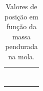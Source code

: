 \begin{table}
\begin{tabular}{lp{25mm}p{25mm}p{25mm}l}
	& \cellcolor[gray]{0.95} & \cellcolor[gray]{0.97} & \cellcolor[gray]{0.95} \\
	& \cellcolor[gray]{0.89} & \cellcolor[gray]{0.92} & \cellcolor[gray]{0.89} \\
	& \cellcolor[gray]{0.95} & \cellcolor[gray]{0.97} & \cellcolor[gray]{0.95} \\
	& \cellcolor[gray]{0.89} & \cellcolor[gray]{0.92} & \cellcolor[gray]{0.89} \\
	& \cellcolor[gray]{0.95} & \cellcolor[gray]{0.97} & \cellcolor[gray]{0.95} \\
	& \cellcolor[gray]{0.89} & \cellcolor[gray]{0.92} & \cellcolor[gray]{0.89} \\
	& \cellcolor[gray]{0.95} & \cellcolor[gray]{0.97} & \cellcolor[gray]{0.95} \\
	\cmidrule{2-4}
\bottomrule
\end{tabular}
\caption{Valores de posição em função da massa pendurada na mola.}
\label{Dados}
\end{table}
